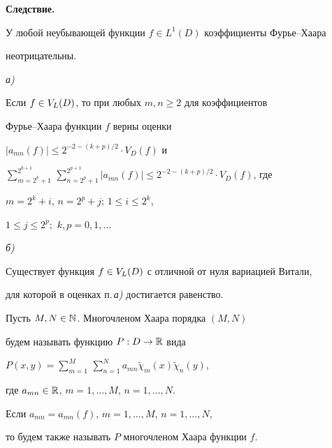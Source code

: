 {\bf Следствие.}


У любой неубывающей функции $f\in L^1(D)$ коэффициенты Фурье--Хаара


не\-от\-рицательны.





\begin{thm}


{\em а)}


Если $f\in V_L(D)$, то при любых $m,n \geqslant 2$ для коэффициентов


Фурье--Хаара функции $f$ верны оценки


$|a_{mn}(f)| \leqslant 2^{-2-(k+p)/2} \cdot V_D(f)$ и


$\sum\limits_{m=2^k+1}^{2^{k+1}}\, \sum\limits_{n=2^p+1}^{2^{p+1}}


|a_{mn}(f)| \leqslant 2^{-2-(k+p)/2} \cdot V_D(f)$, где


$m=2^k+i$, $n=2^p+j$; $1\leqslant i\leqslant 2^k$,


$1\leqslant j\leqslant 2^p;$ $k,p=0,1,\dotsc$





{\em б)}


Существует функция $f\in V_L(D)$ с отличной от нуля вариацией Витали,


для которой в оценках п.\,{\em а)} достигается равенство.


\end{thm}





\begin{defn}


Пусть $M,N\in{\Bbb N}$. Многочленом Хаара порядка $(M,N)$


будем называть функцию $P: D\to{\Bbb R}$ вида


$P(x,y)=\sum\limits_{m=1}^M\, \sum\limits_{n=1}^N a_{mn}


\widetilde\chi_m(x) \widetilde\chi_n(y)$,


где $a_{mn}\in{\Bbb R}$, $m=1,\dotsc,M$, $n=1,\dotsc,N$.





Если $a_{mn}=a_{mn}(f)$, $m=1,\dotsc,M$, $n=1,\dotsc,N$,


то будем также называть $P$ многочленом Хаара функции $f$.


\end{defn}





